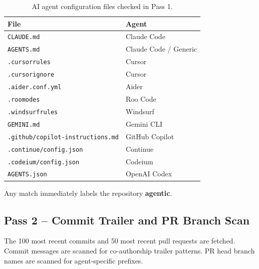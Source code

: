 \documentclass[11pt, a4paper]{article}
\begin{document}
\begin{table}[h]
\centering
\caption{AI agent configuration files checked in Pass 1.}
\begin{tabular}{@{}ll@{}}
\toprule
\textbf{File} & \textbf{Agent} \\
\midrule
\texttt{CLAUDE.md}                       & Claude Code \\
\texttt{AGENTS.md}                       & Claude Code / Generic \\
\texttt{.cursorrules}                    & Cursor \\
\texttt{.cursorignore}                   & Cursor \\
\texttt{.aider.conf.yml}                 & Aider \\
\texttt{.roomodes}                       & Roo Code \\
\texttt{.windsurfrules}                  & Windsurf \\
\texttt{GEMINI.md}                       & Gemini CLI \\
\texttt{.github/copilot-instructions.md} & GitHub Copilot \\
\texttt{.continue/config.json}           & Continue \\
\texttt{.codeium/config.json}            & Codeium \\
\texttt{AGENTS.json}                     & OpenAI Codex \\
\bottomrule
\end{tabular}
\end{table}

Any match immediately labels the repository \textbf{agentic}.

\subsection*{Pass 2 -- Commit Trailer and PR Branch Scan}

The 100 most recent commits and 50 most recent pull requests are fetched.
Commit messages are scanned for co-authorship trailer patterns. PR head
branch names are scanned for agent-specific prefixes.
\end{document}
